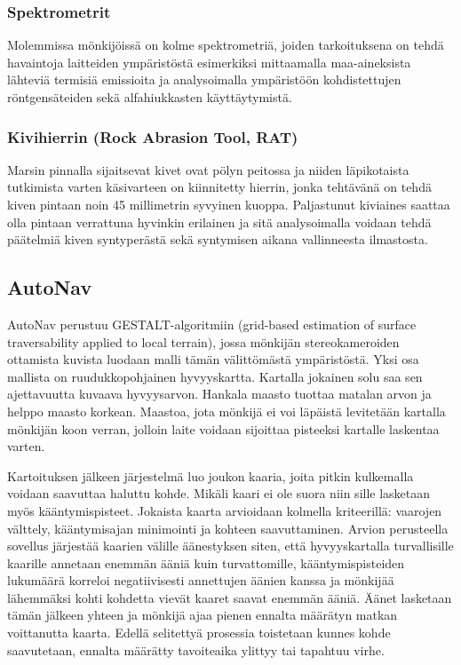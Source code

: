 \documentclass[finnish]{tktltiki2}
\theoremstyle{definition}
\theoremstyle{remark}
\begin{document}
\subsubsection{Spektrometrit}
Molemmissa mönkijöissä on kolme spektrometriä, joiden tarkoituksena on tehdä havaintoja laitteiden ympäristöstä esimerkiksi mittaamalla maa-aineksista lähteviä termisiä emissioita ja analysoimalla ympäristöön kohdistettujen röntgensäteiden sekä alfahiukkasten käyttäytymistä.\cite{spectrometers}

\subsubsection{Kivihierrin (Rock Abrasion Tool, RAT)}
Marsin pinnalla sijaitsevat kivet ovat pölyn peitossa ja niiden läpikotaista tutkimista varten käsivarteen on kiinnitetty hierrin, jonka tehtävänä on tehdä kiven pintaan noin 45 millimetrin syvyinen kuoppa. Paljastunut kiviaines saattaa olla pintaan verrattuna hyvinkin erilainen ja sitä analysoimalla voidaan tehdä päätelmiä kiven syntyperästä sekä syntymisen aikana vallinneesta ilmastosta.\cite{abra}

\subsection{AutoNav}
AutoNav perustuu GESTALT-algoritmiin (grid-based estimation of surface traversability applied to local terrain), jossa mönkijän stereokameroiden ottamista kuvista luodaan malli tämän välittömästä ympäristöstä. Yksi osa mallista on ruudukkopohjainen hyvyyskartta. Kartalla jokainen solu saa sen ajettavuutta kuvaava hyvyysarvon. Hankala maasto tuottaa matalan arvon ja helppo maasto korkean. Maastoa, jota mönkijä ei voi läpäistä levitetään kartalla mönkijän koon verran, jolloin laite voidaan sijoittaa pisteeksi kartalle laskentaa varten.

Kartoituksen jälkeen järjestelmä luo joukon kaaria, joita pitkin kulkemalla voidaan saavuttaa haluttu kohde. Mikäli kaari ei ole suora niin sille lasketaan myös kääntymispisteet. Jokaista kaarta arvioidaan kolmella kriteerillä: vaarojen välttely, kääntymisajan minimointi ja kohteen saavuttaminen. Arvion perusteella sovellus järjestää kaarien välille äänestyksen siten, että hyvyyskartalla turvallisille kaarille annetaan enemmän ääniä kuin turvattomille, kääntymispisteiden lukumäärä korreloi negatiivisesti annettujen äänien kanssa ja mönkijää lähemmäksi kohti kohdetta vievät kaaret saavat enemmän ääniä. Äänet lasketaan tämän jälkeen yhteen ja mönkijä ajaa pienen ennalta määrätyn matkan voittanutta kaarta. Edellä selitettyä prosessia toistetaan kunnes kohde saavutetaan, ennalta määrätty tavoiteaika ylittyy tai tapahtuu virhe.
\end{document}
